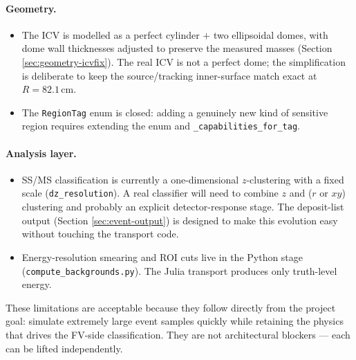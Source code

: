 \documentclass[11pt]{article}
\begin{document}
\paragraph{Geometry.}
\begin{itemize}
\item The ICV is modelled as a perfect cylinder $+$ two ellipsoidal domes,
with dome wall thicknesses adjusted to preserve the measured masses
(Section \ref{sec:geometry-icvfix}). The real ICV is not a perfect dome;
the simplification is deliberate to keep the source/tracking inner-surface
match exact at $R = 82.1$\,cm.
\item The \texttt{RegionTag} enum is closed: adding a genuinely new kind of
sensitive region requires extending the enum and
\texttt{\_capabilities\_for\_tag}.
\end{itemize}

\paragraph{Analysis layer.}
\begin{itemize}
\item SS/MS classification is currently a one-dimensional $z$-clustering
with a fixed scale (\texttt{dz\_resolution}). A real classifier will need
to combine $z$ and ($r$ or $xy$) clustering and probably an explicit
detector-response stage. The deposit-list output (Section
\ref{sec:event-output}) is designed to make this evolution easy without
touching the transport code.
\item Energy-resolution smearing and ROI cuts live in the Python stage
(\texttt{compute\_backgrounds.py}). The Julia transport produces only
truth-level energy.
\end{itemize}

These limitations are acceptable because they follow directly from the
project goal: simulate extremely large event samples quickly while
retaining the physics that drives the FV-side classification. They are
not architectural blockers --- each can be lifted independently.
\end{document}
